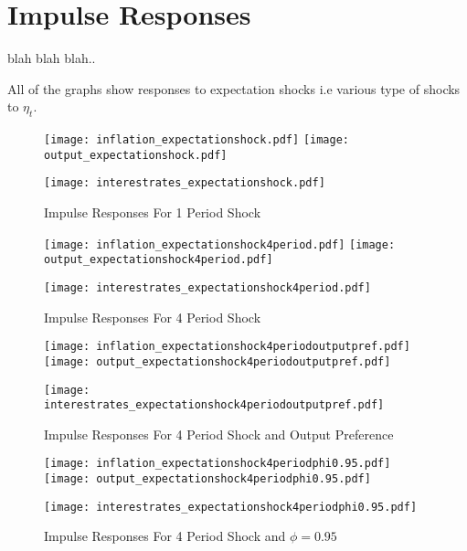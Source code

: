 \documentclass[12pt]{article}
\newcommand{\1}{\mathbbm 1}
\begin{document}
		\section{Impulse Responses}
		
		blah blah blah..
		
		
		
	All of the graphs show responses to expectation shocks i.e various type of shocks to $\eta_{t}$.
		
		
		
		
		
		
		\begin{figure}[H]
				\texttt{[image: inflation\_expectationshock.pdf]}
				\hfill
				\texttt{[image: output\_expectationshock.pdf]}
				\hfill
				\begin{Center}
				\texttt{[image: interestrates\_expectationshock.pdf]}
				\end{Center}
				\caption{Impulse Responses For 1 Period Shock}
		\end{figure}
		
		
			\begin{figure}[H]
			\texttt{[image: inflation\_expectationshock4period.pdf]}
			\hfill
			\texttt{[image: output\_expectationshock4period.pdf]}
			\hfill
			\begin{Center}
				\texttt{[image: interestrates\_expectationshock4period.pdf]}
			\end{Center}
			\caption{Impulse Responses For 4 Period Shock}
		\end{figure}
	
	
	\begin{figure}[H]
		\texttt{[image: inflation\_expectationshock4periodoutputpref.pdf]}
		\hfill
		\texttt{[image: output\_expectationshock4periodoutputpref.pdf]}
		\hfill
		\begin{Center}
			\texttt{[image: interestrates\_expectationshock4periodoutputpref.pdf]}
		\end{Center}
		\caption{Impulse Responses For 4 Period Shock and Output Preference}
	\end{figure}


	\begin{figure}[H]
	\texttt{[image: inflation\_expectationshock4periodphi0.95.pdf]}
	\hfill
	\texttt{[image: output\_expectationshock4periodphi0.95.pdf]}
	\hfill
	\begin{Center}
		\texttt{[image: interestrates\_expectationshock4periodphi0.95.pdf]}
	\end{Center}
	\caption{Impulse Responses For 4 Period Shock and $\phi = 0.95$}
\end{figure}
\end{document}
